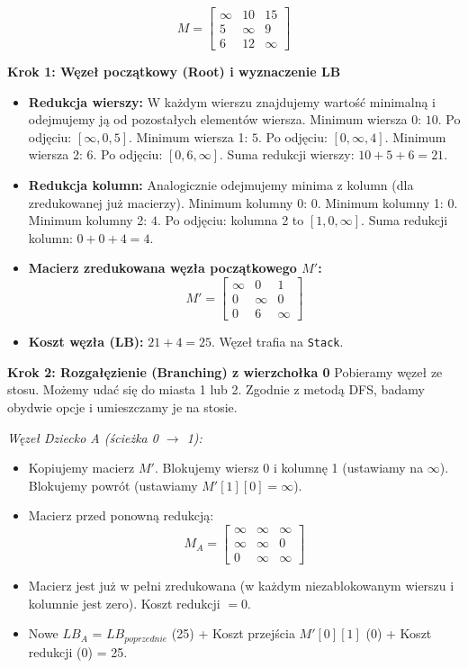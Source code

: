 \documentclass[12pt, a4paper]{article}
\begin{document}
	$$ M = \begin{bmatrix} \infty & 10 & 15 \\ 5 & \infty & 9 \\ 6 & 12 & \infty \end{bmatrix} $$
	
	\textbf{Krok 1: Węzeł początkowy (Root) i wyznaczenie LB}
	\begin{itemize}
		\item \textbf{Redukcja wierszy:} W każdym wierszu znajdujemy wartość minimalną i odejmujemy ją od pozostałych elementów wiersza. 
		Minimum wiersza 0: $10$. Po odjęciu: $[\infty, 0, 5]$.
		Minimum wiersza 1: $5$. Po odjęciu: $[0, \infty, 4]$.
		Minimum wiersza 2: $6$. Po odjęciu: $[0, 6, \infty]$.
		Suma redukcji wierszy: $10 + 5 + 6 = 21$.
		\item \textbf{Redukcja kolumn:} Analogicznie odejmujemy minima z kolumn (dla zredukowanej już macierzy).
		Minimum kolumny 0: $0$.
		Minimum kolumny 1: $0$.
		Minimum kolumny 2: $4$. Po odjęciu: kolumna 2 to $[1, 0, \infty]$.
		Suma redukcji kolumn: $0 + 0 + 4 = 4$.
		\item \textbf{Macierz zredukowana węzła początkowego $M'$:}
		$$ M' = \begin{bmatrix} \infty & 0 & 1 \\ 0 & \infty & 0 \\ 0 & 6 & \infty \end{bmatrix} $$
		\item \textbf{Koszt węzła (LB):} $21 + 4 = 25$. Węzeł trafia na \texttt{Stack}.
	\end{itemize}
	
	\textbf{Krok 2: Rozgałęzienie (Branching) z wierzchołka 0}
	Pobieramy węzeł ze stosu. Możemy udać się do miasta 1 lub 2. Zgodnie z metodą DFS, badamy obydwie opcje i umieszczamy je na stosie.
	
	\textit{Węzeł Dziecko A (ścieżka 0 $\rightarrow$ 1):}
	\begin{itemize}
		\item Kopiujemy macierz $M'$. Blokujemy wiersz 0 i kolumnę 1 (ustawiamy na $\infty$). Blokujemy powrót (ustawiamy $M'[1][0] = \infty$).
		\item Macierz przed ponowną redukcją:
		$$ M_A = \begin{bmatrix} \infty & \infty & \infty \\ \infty & \infty & 0 \\ 0 & \infty & \infty \end{bmatrix} $$
		\item Macierz jest już w pełni zredukowana (w każdym niezablokowanym wierszu i kolumnie jest zero). Koszt redukcji $= 0$.
		\item Nowe $LB_A$ = $LB_{poprzednie}$ (25) + Koszt przejścia $M'[0][1]$ (0) + Koszt redukcji (0) = 25.
	\end{itemize}
	
\end{document}
